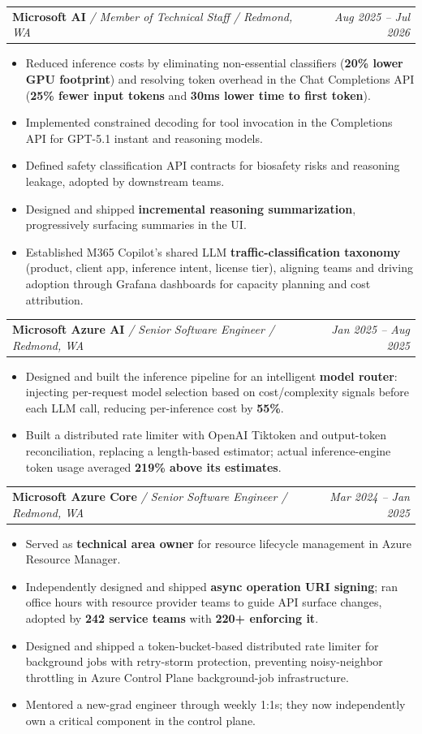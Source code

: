 \documentclass[letterpaper,10pt]{extarticle}
\makeatletter
\newcommand{\resumeSubheading}[4]{
  \vspace{-1pt}\item
    \begin{tabular*}{0.97\textwidth}{l@{\extracolsep{\fill}}r}
      \textbf{#1} \textit{\small / #3 / #4} & \textit{\small #2} \\
    \end{tabular*}\vspace{-5pt}
}
\newcommand{\resumeItemListStart}{\begin{itemize}[leftmargin=*, itemsep=0pt, topsep=2pt, parsep=0pt, partopsep=0pt]}
\newcommand{\resumeItemListEnd}{\end{itemize}\vspace{-4pt}}
\makeatother
\begin{document}
  \resumeSubheading
    {Microsoft AI}{Aug 2025 -- Jul 2026}
    {Member of Technical Staff}{Redmond, WA}
    \resumeItemListStart
      \item\small{Reduced inference costs by eliminating non-essential classifiers (\textbf{20\% lower GPU footprint}) and resolving token overhead in the Chat Completions API (\textbf{25\% fewer input tokens} and \textbf{30ms lower time to first token}).}
      \item\small{Implemented constrained decoding for tool invocation in the Completions API for GPT-5.1 instant and reasoning models.}
      \item\small{Defined safety classification API contracts for biosafety risks and reasoning leakage, adopted by downstream teams.}
      \item\small{Designed and shipped \textbf{incremental reasoning summarization}, progressively surfacing summaries in the UI.}
      \item\small{Established M365 Copilot's shared LLM \textbf{traffic-classification taxonomy} (product, client app, inference intent, license tier), aligning teams and driving adoption through Grafana dashboards for capacity planning and cost attribution.}
    \resumeItemListEnd

  \resumeSubheading
    {Microsoft Azure AI}{Jan 2025 -- Aug 2025}
    {Senior Software Engineer}{Redmond, WA}
    \resumeItemListStart
      \item\small{Designed and built the inference pipeline for an intelligent \textbf{model router}: injecting per-request model selection based on cost/complexity signals before each LLM call, reducing per-inference cost by \textbf{55\%}.}
      \item\small{Built a distributed rate limiter with OpenAI Tiktoken and output-token reconciliation, replacing a length-based estimator; actual inference-engine token usage averaged \textbf{219\% above its estimates}.}
    \resumeItemListEnd

  \resumeSubheading
    {Microsoft Azure Core}{Mar 2024 -- Jan 2025}
    {Senior Software Engineer}{Redmond, WA}
    \resumeItemListStart
      \item\small{Served as \textbf{technical area owner} for resource lifecycle management in Azure Resource Manager.}
      \item\small{Independently designed and shipped \textbf{async operation URI signing}; ran office hours with resource provider teams to guide API surface changes, adopted by \textbf{242 service teams} with \textbf{220+ enforcing it}.}
      \item\small{Designed and shipped a token-bucket-based distributed rate limiter for background jobs with retry-storm protection, preventing noisy-neighbor throttling in Azure Control Plane background-job infrastructure.}
      \item\small{Mentored a new-grad engineer through weekly 1:1s; they now independently own a critical component in the control plane.}
    \resumeItemListEnd
\end{document}
